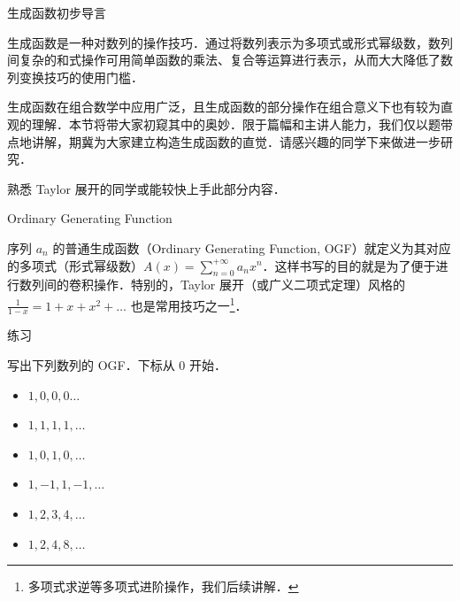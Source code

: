 \documentclass[fontset=fandol]{ctexbeamer}
\begin{document}
\begin{frame}{生成函数初步}{导言}

生成函数是一种对数列的操作技巧．通过将数列表示为多项式或形式幂级数，数列间复杂的和式操作可用简单函数的乘法、复合等运算进行表示，从而大大降低了数列变换技巧的使用门槛．

生成函数在组合数学中应用广泛，且生成函数的部分操作在组合意义下也有较为直观的理解．本节将带大家初窥其中的奥妙．限于篇幅和主讲人能力，我们仅以题带点地讲解，期冀为大家建立构造生成函数的直觉．请感兴趣的同学下来做进一步研究．

熟悉 Taylor 展开的同学或能较快上手此部分内容．

\end{frame}

\begin{frame}{Ordinary Generating Function}

序列 $a_n$ 的普通生成函数（Ordinary Generating Function, OGF）就定义为其对应的多项式（形式幂级数）$A(x) = \sum_{n=0}^{+\infty} a_n x^n$．这样书写的目的就是为了便于进行数列间的卷积操作．特别的，Taylor 展开（或广义二项式定理）风格的 $\frac 1 {1-x} = 1 + x + x^2 + \dots$ 也是常用技巧之一\footnote{多项式求逆等多项式进阶操作，我们后续讲解．}．

\begin{exampleblock}{练习}

写出下列数列的 OGF．下标从 $0$ 开始．

\begin{itemize}
    \item $1,0,0,0\dots$
    \item $1,1,1,1,\dots$
    \item $1,0,1,0,\dots$
    \item $1,-1,1,-1,\dots$
    \item $1,2,3,4,\dots$
    \item $1,2,4,8,\dots$
\end{itemize}
\end{exampleblock}

\end{frame}
\end{document}
